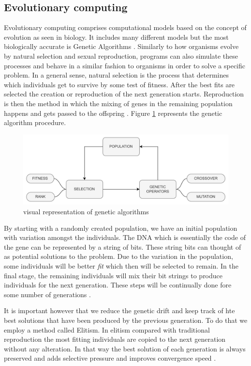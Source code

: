 \subsection{Evolutionary computing}
Evolutionary computing comprises computational models based on the concept of evolution as seen in biology. It includes many different models but the most biologically accurate is Genetic Algorithms \cite{drugan2019reinforcement} . Similarly to how organisms evolve by natural selection and sexual reproduction, programs can also simulate these processes and behave in a similar fashion to organisms in order to solve a specific problem. In a general sense, natural selection is the process that determines which individuals get to survive by some test of fitness. After the best fits are selected the creation or reproduction of the next generation starts. Reproduction is then the method in which the mixing of genes in the remaining population happens and gets passed to the offspring \cite{holland1992genetic}. Figure \ref{figGA} represents the genetic algorithm procedure.
\begin{figure}[H]
    \centering
    \includegraphics [scale = 0.08]{Images/GA_graph.png}
    \caption{visual representation of genetic algorithms}
    \label{figGA}
\end{figure}

By starting with a randomly created population, we have an initial population with variation amongst the individuals. The DNA which is essentially the code of the gene can be represented by a string of bits. These string bits can thought of as potential solutions to the problem. Due to the variation in the population, some individuals will be better \textit{fit} which then will be selected to remain. In the final stage, the remaining individuals will mix their bit strings to produce individuals for the next generation. These steps will be continually done fore some number of generations \cite{forrest1996genetic}. 

It is important however that we reduce the genetic drift and keep track of hte best solutions that have been produced by the previous generation. To do that we employ a method called Elitism. In elitism compared with traditional reproduction the most fitting individuals are copied to the next generation without any alteration. In that way the best solution of each generation is always preserved and adds selective pressure and improves convergence speed \cite{du2018elitism}.

